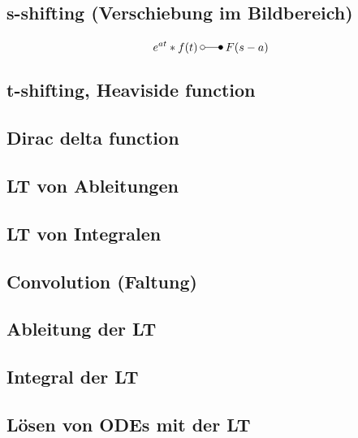 \subsection{s-shifting (Verschiebung im Bildbereich)}
\begin{equation*}
    e^{at}*f(t)\:\laplace\:F(s-a)
\end{equation*}

\subsection{t-shifting, Heaviside function}
\subsection{Dirac delta function}
\subsection{LT von Ableitungen}
\subsection{LT von Integralen}
\subsection{Convolution (Faltung)}
\subsection{Ableitung der LT}
\subsection{Integral der LT}
\subsection{Lösen von ODEs mit der LT}
